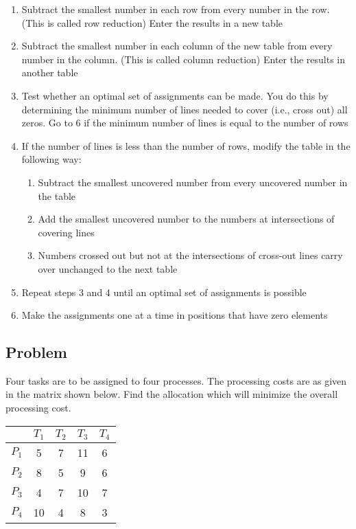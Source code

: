\documentclass[12pt]{article}
\begin{document}
\begin{enumerate}
\item Subtract the smallest number in each row from every number in the row. (This is called row reduction) Enter the results in a new table
\item Subtract the smallest number in each column of the new table from every number in the column. (This is called column reduction) Enter the results in another table
\item Test whether an optimal set of assignments can be made. You do this by determining the minimum number of lines needed to cover (i.e., cross out) all zeros. Go to 6 if the minimum number of lines is equal to the number of rows
\item If the number of lines is less than the number of rows, modify the table in the following way:
\begin{enumerate}
\item Subtract the smallest uncovered number from every uncovered number in the table
\item Add the smallest uncovered number to the numbers at intersections of covering lines
\item Numbers crossed out but not at the intersections of cross-out lines carry over unchanged to the next table
\end{enumerate}
\item Repeat steps 3 and 4 until an optimal set of assignments is possible
\item Make the assignments one at a time in positions that have zero elements
\end{enumerate}

\subsection{Problem}
Four tasks are to be assigned to four processes. The processing costs are as given
in the matrix shown below. Find the allocation which will minimize the overall processing cost.


\begin{center}
\begin{tabular}{|c|cccc|}
\hline
   & $T_1$ & $T_2$ & $T_3$ & $T_4$ \\
\hline
$P_1$ & 5  & 7  & 11 & 6  \\
$P_2$ & 8  & 5  & 9  & 6  \\
$P_3$ & 4  & 7  & 10 & 7  \\
$P_4$ & 10 & 4  & 8  & 3  \\
\hline
\end{tabular}
\end{center}
\end{document}
